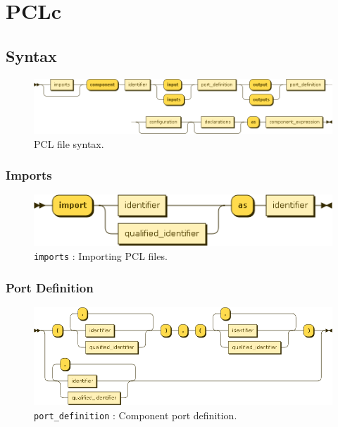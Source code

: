 \newcommand{\DiagramScale}{0.6}
\chapter{PCLc}

\section{Syntax}
\begin{figure}[!h]
  \centering
    \includegraphics[scale=\DiagramScale,angle=90]{chapters/compiler/diagrams/component}
  \caption{PCL file syntax.}
  \label{fig:pcl-top-level}
\end{figure}

\subsection{Imports}
\begin{figure}[!h]
  \centering
    \includegraphics[scale=\DiagramScale]{chapters/compiler/diagrams/imports}
  \caption{\texttt{imports} : Importing PCL files.}
  \label{fig:pcl-imports}
\end{figure}

\subsection{Port Definition}
\begin{figure}[!h]
  \centering
    \includegraphics[scale=\DiagramScale,angle=90]{chapters/compiler/diagrams/port_definition}
  \caption{\texttt{port\_definition} : Component port definition.}
  \label{fig:pcl-port-defs}
\end{figure}

